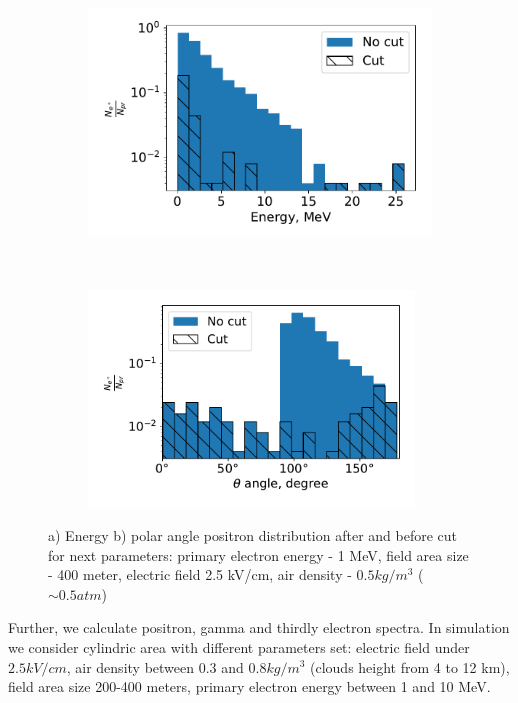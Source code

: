 \documentclass{webofc}
\begin{document}
\begin{figure}[ht!]
	\begin{subfigure}[b]{0.5\textwidth}
    	\includegraphics[width=0.95\linewidth]{pictures/04_energy_cut_positron}
        \caption{}
        \label{pic-positron-cut-a}
    \end{subfigure}
	~
    \begin{subfigure}[b]{0.5\textwidth}
		\includegraphics[width=0.95\textwidth]{pictures/05_theta_cut_positron}
        \caption{}
        \label{pic-positron-cut-b}
    \end{subfigure}
    \caption{ a) Energy b) polar angle positron distribution after and before cut for next parameters: primary electron energy - 1 MeV, field area size - 400 meter, electric field 2.5 kV/cm, air density - $0.5 kg/m^3$ ($\sim 0.5 atm$)}
\end{figure}

Further, we calculate positron, gamma and thirdly electron spectra. In simulation we consider cylindric area with different parameters set: electric field under $2.5 kV/cm$, air density between $0.3$ and $0.8 kg/m^3$ (clouds height from 4 to 12 km), field area size  200-400 meters, primary electron energy between 1 and 10 MeV.
\end{document}
